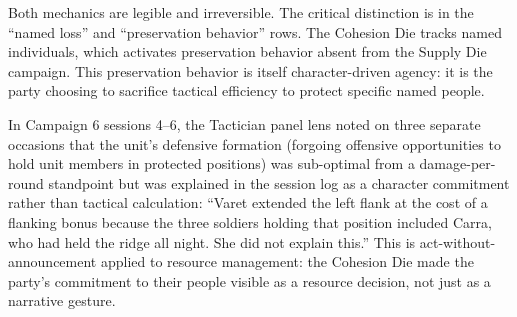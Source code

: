 Both mechanics are legible and irreversible. The critical distinction is in the
``named loss'' and ``preservation behavior'' rows. The Cohesion Die tracks named
individuals, which activates preservation behavior absent from the Supply Die campaign.
This preservation behavior is itself character-driven agency: it is the party choosing
to sacrifice tactical efficiency to protect specific named people.

In Campaign 6 sessions 4--6, the Tactician panel lens noted on three separate occasions
that the unit's defensive formation (forgoing offensive opportunities to hold unit
members in protected positions) was sub-optimal from a damage-per-round standpoint but
was explained in the session log as a character commitment rather than tactical
calculation: ``Varet extended the left flank at the cost of a flanking bonus because
the three soldiers holding that position included Carra, who had held the ridge all
night. She did not explain this.'' This is act-without-announcement applied to resource
management: the Cohesion Die made the party's commitment to their people visible as a
resource decision, not just as a narrative gesture.
